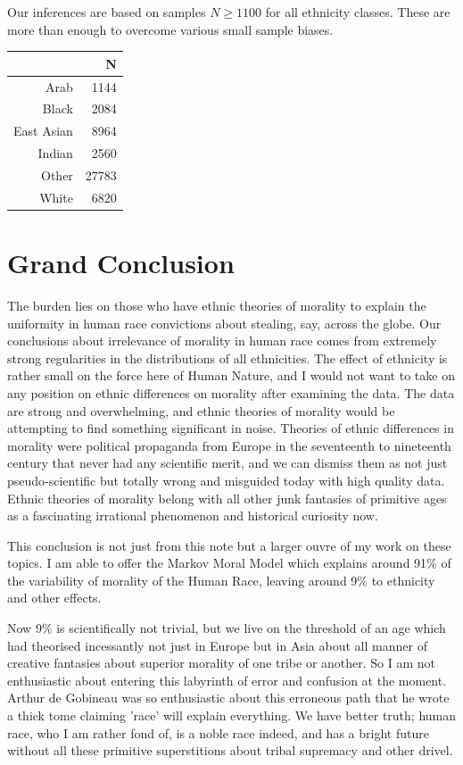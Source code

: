 \documentclass{amsart}
\begin{document}
Our inferences are based on samples $N \ge 1100$ for all ethnicity classes.  These are more than enough to overcome various small sample biases.

\begin{table}[ht]
\centering
\begin{tabular}{rr}
  \hline
 & N \\ 
  \hline
Arab & 1144 \\ 
  Black & 2084 \\ 
  East Asian & 8964 \\ 
  Indian & 2560 \\ 
  Other & 27783 \\ 
  White & 6820 \\ 
   \hline
\end{tabular}
\end{table}

\section{Grand Conclusion}

The burden lies on those who have ethnic theories of morality to explain the uniformity in human race convictions about stealing, say, across the globe.  Our conclusions about irrelevance of morality in human race comes from extremely strong regularities in the distributions of all ethnicities. The effect of ethnicity is rather small on the force here of Human Nature, and I would not want to take on any position on ethnic differences on morality after examining the data.  The data are strong and overwhelming, and ethnic theories of morality would be attempting to find something significant in noise.  Theories of ethnic differences in morality were political propaganda from Europe in the seventeenth to nineteenth century that never had any scientific merit, and we can dismiss them as not just pseudo-scientific but totally wrong and misguided today with high quality data.  Ethnic theories of morality belong with all other junk fantasies of primitive ages as a fascinating irrational phenomenon and historical curiosity now.

This conclusion is not just from this note but a larger ouvre of my work on these topics.  I am able to offer the Markov Moral Model which explains around 91\% of the variability of morality of the Human Race, leaving around 9\% to ethnicity and other effects.  

Now 9\% is scientifically not trivial, but we live on the threshold of an age which had theorised incessantly not just in Europe but in Asia about all manner of creative fantasies about superior morality of one tribe or another.  So I am not enthusiastic about entering this labyrinth of error and confusion at the moment.  Arthur de Gobineau was so enthusiastic about this erroneous path that he wrote a thick tome claiming 'race' will explain everything.  We have better truth; human race, who I am rather fond of, is a noble race indeed, and has a bright future without all these primitive superstitions about tribal supremacy and other drivel.
\end{document}

